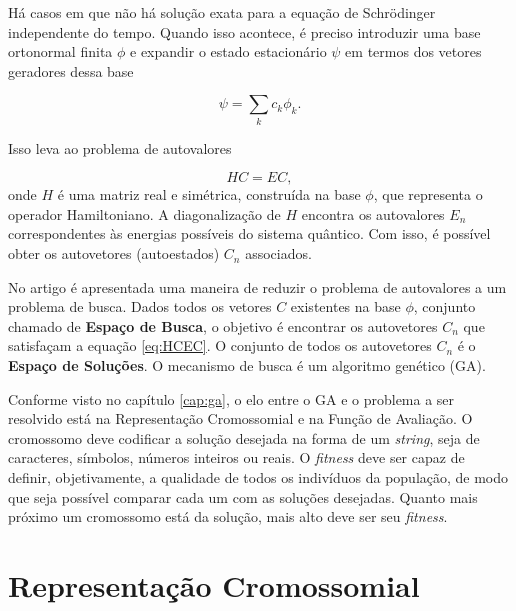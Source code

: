 
	Há casos em que não há solução exata para a equação de Schrödinger independente do tempo. Quando isso acontece, é preciso introduzir uma base ortonormal finita {$\phi$} e expandir o estado estacionário $\psi$ em termos dos vetores geradores dessa base
	
	\begin{equation}
		\psi = \sum_k c_k \phi_k.
	\end{equation}
	
	Isso leva ao problema de autovalores
	
	\begin{equation}\label{eq:HCEC}
		HC = EC,
	\end{equation}
	onde $H$ é uma matriz real e simétrica, construída na base ${\phi}$, que representa o operador Hamiltoniano. A diagonalização de $H$ encontra os autovalores $E_n$ correspondentes às energias possíveis do sistema quântico. Com isso, é possível obter os autovetores (autoestados) $C_n$ associados.
	
	No artigo \cite{metodo2004} é apresentada uma maneira de reduzir o problema de autovalores a um problema de busca. Dados todos os vetores $C$ existentes na base $\phi$, conjunto chamado de \textbf{Espaço de Busca}, o objetivo é encontrar os autovetores $C_n$ que satisfaçam a equação \ref{eq:HCEC}. O conjunto de todos os autovetores $C_n$ é o \textbf{Espaço de Soluções}. O mecanismo de busca é um algoritmo genético (GA).
	
	Conforme visto no capítulo \ref{cap:ga}, o elo entre o GA e o problema a ser resolvido está na Representação Cromossomial e na Função de Avaliação. O cromossomo deve codificar a solução desejada na forma de um \emph{string}, seja de caracteres, símbolos, números inteiros ou reais. O \emph{fitness} deve ser capaz de definir, objetivamente, a qualidade de todos os indivíduos da população, de modo que seja possível comparar cada um com as soluções desejadas. Quanto mais próximo um cromossomo está da solução, mais alto deve ser seu \emph{fitness}.

	\section{Representação Cromossomial}
	

